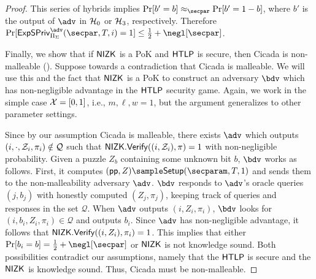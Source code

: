 \begin{proof}
    This series of hybrids implies $\Pr[b'=b] \approx_\secpar \Pr[b'=1-b]$, where $b'$ is the output of $\adv$ in $\mathcal{H}_0$ or $\mathcal{H}_3$, respectively. Therefore $\Pr[\Exp = 1] \leq \frac{1}{2} + \negl[\secpar]$.
    
    Finally, we show that if $\mathsf{NIZK}$ is a PoK and $\mathsf{HTLP}$ is secure, then Cicada is non-malleable (). Suppose towards a contradiction that Cicada is malleable. We will use this and the fact that $\mathsf{NIZK}$ is a PoK to construct an adversary $\bdv$ which has non-negligible advantage in the $\mathsf{HTLP}$ security game. Again, we work in the simple case $\mathcal{X} = [0,1]$, i.e., $m,\ell,w=1$, but the argument generalizes to other parameter settings.
    
    Since by our assumption Cicada is malleable, there exists $\adv$ which outputs $(i, \cdot, \mathcal{Z}_i, \pi_i) \notin \mathcal{Q}$ such that $\mathsf{NIZK}.\mathsf{Verify}((i,\allowbreak \mathcal{Z}_i), \pi)=1$ with non-negligible probability. 
    Given a puzzle $Z_b$ containing some unknown bit $b$, $\bdv$ works as follows. First, it computes $(\pparam, Z) \sample \Setup(\secparam, \timeT, 1)$ and sends them to the non-malleability adversary $\adv$. $\bdv$ responds to $\adv$'s oracle queries $(j, b_j)$ with honestly computed $(Z_j, \pi_j)$, keeping track of queries and responses in the set $\mathcal{Q}$. When $\adv$ outputs $(i, Z_i, \pi_i)$, $\bdv$ looks for $(i, b_i, Z_i, \pi_i) \in \mathcal{Q}$ and outputs $b_i$. Since $\adv$ has non-negligible advantage, it follows that $\mathsf{NIZK}.\mathsf{Verify}((i, Z_i), \pi_i) = 1$. This implies that either $\Pr[b_i=b] = \frac{1}{2} + \negl[\secpar]$ or $\mathsf{NIZK}$ is not knowledge sound. Both possibilities contradict our assumptions, namely that the $\mathsf{HTLP}$ is secure and the $\mathsf{NIZK}$ is knowledge sound. Thus, Cicada must be non-malleable.
\end{proof}